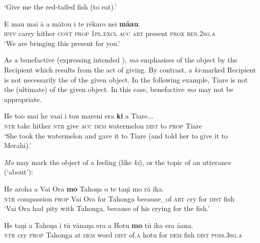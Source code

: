 \glt 
‘Give me the red-tailed fish (to eat).’ \textstyleExampleref{[Mtx-5-04.014]}
\z

\ea\label{ex:8.180}
\gll E ma{\ꞌ}u mai {\ꞌ}ā a mātou i te rēkaro nei \textbf{mā{\ꞌ}au}. \\
\textsc{ipfv} carry hither \textsc{cont} \textsc{prop} \textsc{1pl.excl} \textsc{acc} \textsc{art} present \textsc{prox} \textsc{ben.2sg.a} \\

\glt
‘We are bringing this present for you.’ \textstyleExampleref{[R210.127]} 
\z

As a benefactive  (expressing intended ), \textit{mo} emphasises  of the object by the Recipient which results from the act of giving. By contrast, a \textit{ki}{}-marked Recipient is not necessarily the  of the given object. In the following example, Tiare is not the (ultimate)  of the given object. In this case, benefactive \textit{mo} may not be appropriate.

\ea\label{ex:8.181}
\gll He to{\ꞌ}o mai he va{\ꞌ}ai i tou mareni era \textbf{ki} a Tiare... \\
\textsc{ntr} take hither \textsc{ntr} give \textsc{acc} \textsc{dem} watermelon \textsc{dist} to \textsc{prop} Tiare \\

\glt
‘She took the watermelon and gave it to Tiare (and told her to give it to Merahi).’ \textstyleExampleref{[R309.072]} 
\z

\textit{Mo} may mark the object of a feeling (like \textit{ki}), or the topic of an utterance (‘about’):

\ea\label{ex:8.182}
\gll He {\ꞌ}aroha a Vai Ora \textbf{mo} Tahoŋa {\ꞌ}o te taŋi mo rā ika.\\
\textsc{ntr} compassion \textsc{prop} Vai Ora for Tahonga because\_of \textsc{art} cry for \textsc{dist} fish\\

\glt 
‘Vai Ora had pity with Tahonga, because of his crying for the fish.’ \textstyleExampleref{[R301.249]} 
\z

\largerpage
\ea\label{ex:8.183}
\gll He taŋi a Tahoŋa {\ꞌ}i tū vānaŋa era {\ꞌ}a Hotu \textbf{mo} tū ika era {\ꞌ}ā{\ꞌ}ana. \\
\textsc{ntr} cry \textsc{prop} Tahonga at \textsc{dem} word \textsc{dist} of\textsc{.a} hotu for \textsc{dem} fish \textsc{dist} \textsc{poss.3sg.a} \\

